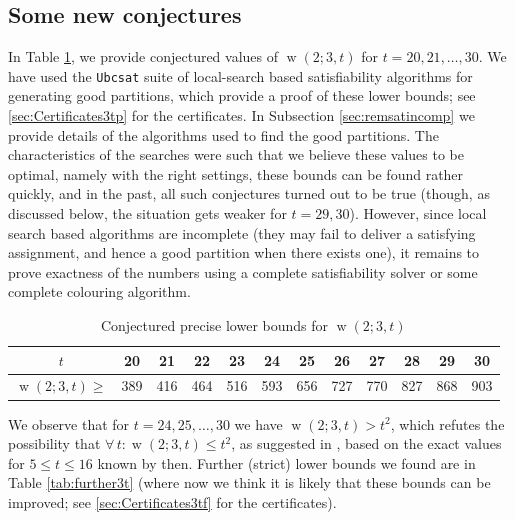\documentclass[final,3p,times]{elsarticle}
\theoremstyle{definition}
\renewcommand{\leq}{\le} %
\DeclareMathOperator{\vdw}{w}
\begin{document}
\subsection{Some new conjectures}
\label{sec:Somenewconjectures}

In Table \ref{tab:conj3t}, we provide conjectured values of $\vdw(2; 3, t)$ for $t=20,21,\ldots,30$.
We have used the {\tt Ubcsat} suite \cite{ubcsat} of local-search based satisfiability
algorithms for generating good partitions, which provide a proof
of these lower bounds; see \ref{sec:Certificates3tp} for the certificates.
In Subsection \ref{sec:remsatincomp} we provide details of the algorithms used to find
the good partitions.
The characteristics of the searches were such that we believe these values to be optimal, namely with the right settings, these bounds can be found rather quickly, and in the past, all such conjectures turned out to be true (though, as discussed below, the situation gets weaker for $t=29,30$). However, since local search based algorithms are incomplete (they may fail to
deliver a satisfying assignment, and hence a good partition when there exists one), it remains to prove
exactness of the numbers using a complete satisfiability solver or some complete colouring algorithm.

\begin{table}[H]
  \centering
  \begin{tabular}{c|*{11}{c}}
    $t$ & 20 & 21 & 22 & 23 & 24 & 25 & 26 & 27 & 28 & 29 & 30\\
    \hline
    $\vdw(2;3,t) \geq$ & 389 & 416 & 464 & 516 & 593 & 656 & 727 & 770 & 827 & 868 & 903
  \end{tabular}
  \caption{Conjectured precise lower bounds for $\vdw(2;3,t)$}
  \label{tab:conj3t}
\end{table}

We observe that for $t=24,25,\ldots,30$ we have $\vdw(2; 3, t)>t^2$, which
refutes the possibility that $\forall\, t : \vdw(2; 3, t)\leq t^2$,
as suggested in \cite{blr2008}, based on the
exact values for $5\leq t \leq 16$ known by then. Further (strict) lower bounds we found are in Table \ref{tab:further3t} (where now we think it is likely that these bounds can be improved; see \ref{sec:Certificates3tf} for the certificates).
\end{document}
